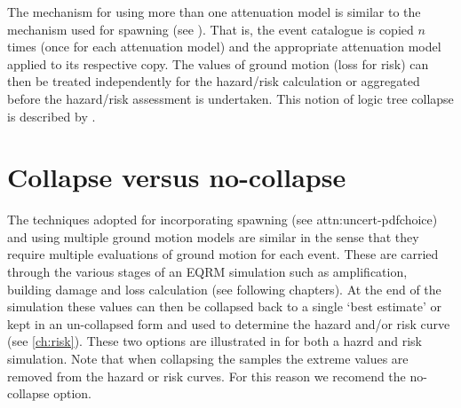 The mechanism for using more than one attenuation model is similar
to the mechanism used for spawning (see
). That is, the event catalogue is
copied $n$ times (once for each attenuation model) and the
appropriate attenuation model applied to its respective copy. The
values of ground motion (loss for risk) can then be treated
independently for the hazard/risk calculation or aggregated before
the hazard/risk assessment is undertaken. This notion of logic tree
collapse is described by .


\section{Collapse versus no-collapse}

The techniques adopted for incorporating spawning (see \sref
{attn:uncert-pdfchoice}) and using multiple ground motion models are
similar in the sense that they require multiple evaluations of
ground motion for each event. These are carried through the various
stages of an EQRM simulation such as amplification, building damage
and loss calculation (see following chapters). At the end of the
simulation these values can then be collapsed back to a single `best
estimate' or kept in an un-collapsed form and used to determine the
hazard and/or risk curve (see \cref{ch:risk}). These two options are
illustrated in  for both a hazrd and
risk simulation. Note that when collapsing the samples the extreme
values are removed from the hazard or risk curves. For this reason
we recomend the no-collapse option.

